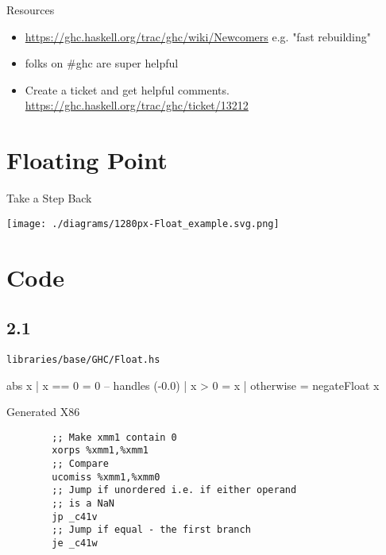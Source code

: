 \documentclass[presentation]{beamer}
\begin{document}
\begin{frame}{Resources}
  \begin{itemize}
    \item
      \url{https://ghc.haskell.org/trac/ghc/wiki/Newcomers} e.g. "fast rebuilding"
    \item
      folks on \#ghc are super helpful
    \item
      Create a ticket and get helpful comments.
      \url{https://ghc.haskell.org/trac/ghc/ticket/13212}
    \end{itemize}
\end{frame}

\section{Floating Point}
\begin{frame}{Take a Step Back}
  \begin{center}
    \texttt{[image: ./diagrams/1280px-Float\_example.svg.png]}
  \end{center}
\end{frame}

\section{Code}
\label{sec:orgheadline9}
\subsection{2.1}
\label{sec:orgheadline8}

\begin{frame}[fragile,label={sec:orgheadline7}]{\texttt{libraries/base/GHC/Float.hs}}

\begin{haskelL}
  abs x | x == 0 = 0 -- handles (-0.0)
        | x > 0 = x
        | otherwise = negateFloat x
\end{haskelL}
\end{frame}

\begin{frame}[fragile]{Generated X86}

\begin{lstlisting}
        ;; Make xmm1 contain 0
        xorps %xmm1,%xmm1
        ;; Compare
        ucomiss %xmm1,%xmm0
        ;; Jump if unordered i.e. if either operand
        ;; is a NaN
        jp _c41v
        ;; Jump if equal - the first branch
        je _c41w
\end{lstlisting}
\end{frame}
\end{document}
